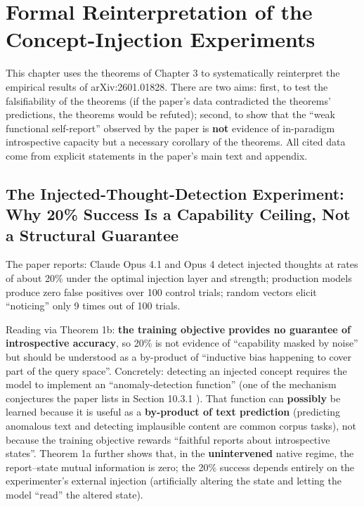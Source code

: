 \section{Formal Reinterpretation of the Concept-Injection Experiments}

This chapter uses the theorems of Chapter 3 to systematically reinterpret the empirical
results of arXiv:2601.01828\cite{lindsey-2026-introspection}. There are two aims: first, to
test the falsifiability of the theorems (if the paper's data contradicted the theorems'
predictions, the theorems would be refuted); second, to show that the ``weak functional
self-report'' observed by the paper is \textbf{not} evidence of in-paradigm introspective
capacity but a necessary corollary of the theorems. All cited data come from explicit
statements in the paper's main text and appendix.

\subsection{The Injected-Thought-Detection Experiment: Why 20\% Success Is a Capability Ceiling, Not a Structural Guarantee}

The paper reports: Claude Opus 4.1 and Opus 4 detect injected thoughts at rates of about 20\%
under the optimal injection layer and strength; production models produce zero false positives
over 100 control trials; random vectors elicit ``noticing'' only 9 times out of 100
trials\cite{lindsey-2026-introspection}.

Reading via Theorem 1b: \textbf{the training objective provides no guarantee of introspective
accuracy}, so 20\% is not evidence of ``capability masked by noise'' but should be understood as
a by-product of ``inductive bias happening to cover part of the query space''. Concretely:
detecting an injected concept requires the model to implement an ``anomaly-detection function''
(one of the mechanism conjectures the paper lists in Section 10.3.1
\cite{lindsey-2026-introspection}). That function can \textbf{possibly} be learned because it
is useful as a \textbf{by-product of text prediction} (predicting anomalous text and detecting
implausible content are common corpus tasks), not because the training objective rewards
``faithful reports about introspective states''. Theorem 1a further shows that, in the
\textbf{unintervened} native regime, the report--state mutual information is zero; the 20\%
success depends entirely on the experimenter's external injection (artificially altering the
state and letting the model ``read'' the altered state).

